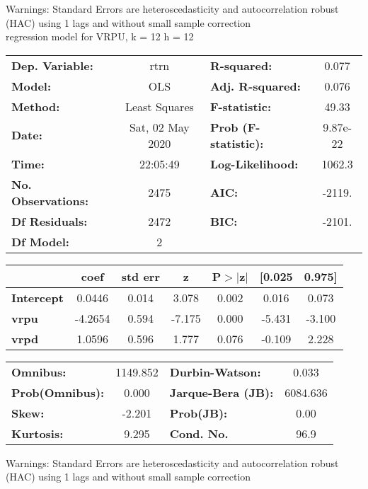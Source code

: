 Warnings: \newline
 [1] Standard Errors are heteroscedasticity and autocorrelation robust (HAC) using 1 lags and without small sample correction\\ 

regression model for VRPU, k = 12 h = 12\begin{center}
\begin{tabular}{lclc}
\toprule
\textbf{Dep. Variable:}    &       rtrn       & \textbf{  R-squared:         } &     0.077   \\
\textbf{Model:}            &       OLS        & \textbf{  Adj. R-squared:    } &     0.076   \\
\textbf{Method:}           &  Least Squares   & \textbf{  F-statistic:       } &     49.33   \\
\textbf{Date:}             & Sat, 02 May 2020 & \textbf{  Prob (F-statistic):} &  9.87e-22   \\
\textbf{Time:}             &     22:05:49     & \textbf{  Log-Likelihood:    } &    1062.3   \\
\textbf{No. Observations:} &        2475      & \textbf{  AIC:               } &    -2119.   \\
\textbf{Df Residuals:}     &        2472      & \textbf{  BIC:               } &    -2101.   \\
\textbf{Df Model:}         &           2      & \textbf{                     } &             \\
\bottomrule
\end{tabular}
\begin{tabular}{lcccccc}
                   & \textbf{coef} & \textbf{std err} & \textbf{z} & \textbf{P$> |$z$|$} & \textbf{[0.025} & \textbf{0.975]}  \\
\midrule
\textbf{Intercept} &       0.0446  &        0.014     &     3.078  &         0.002        &        0.016    &        0.073     \\
\textbf{vrpu}      &      -4.2654  &        0.594     &    -7.175  &         0.000        &       -5.431    &       -3.100     \\
\textbf{vrpd}      &       1.0596  &        0.596     &     1.777  &         0.076        &       -0.109    &        2.228     \\
\bottomrule
\end{tabular}
\begin{tabular}{lclc}
\textbf{Omnibus:}       & 1149.852 & \textbf{  Durbin-Watson:     } &    0.033  \\
\textbf{Prob(Omnibus):} &   0.000  & \textbf{  Jarque-Bera (JB):  } & 6084.636  \\
\textbf{Skew:}          &  -2.201  & \textbf{  Prob(JB):          } &     0.00  \\
\textbf{Kurtosis:}      &   9.295  & \textbf{  Cond. No.          } &     96.9  \\
\bottomrule
\end{tabular}
\end{center}

Warnings: \newline
 [1] Standard Errors are heteroscedasticity and autocorrelation robust (HAC) using 1 lags and without small sample correction\\ 

